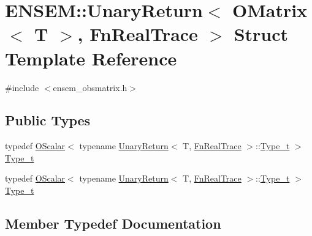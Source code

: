 \hypertarget{structENSEM_1_1UnaryReturn_3_01OMatrix_3_01T_01_4_00_01FnRealTrace_01_4}{}\section{E\+N\+S\+EM\+:\+:Unary\+Return$<$ O\+Matrix$<$ T $>$, Fn\+Real\+Trace $>$ Struct Template Reference}
\label{structENSEM_1_1UnaryReturn_3_01OMatrix_3_01T_01_4_00_01FnRealTrace_01_4}


{\ttfamily \#include $<$ensem\+\_\+obsmatrix.\+h$>$}

\subsection*{Public Types}
\begin{DoxyCompactItemize}
\item 
typedef \mbox{\hyperlink{classENSEM_1_1OScalar}{O\+Scalar}}$<$ typename \mbox{\hyperlink{structENSEM_1_1UnaryReturn}{Unary\+Return}}$<$ T, \mbox{\hyperlink{structENSEM_1_1FnRealTrace}{Fn\+Real\+Trace}} $>$\+::\mbox{\hyperlink{structENSEM_1_1UnaryReturn_3_01OMatrix_3_01T_01_4_00_01FnRealTrace_01_4_aaaa039ed6375a6c096ce155e79a2c9cd}{Type\+\_\+t}} $>$ \mbox{\hyperlink{structENSEM_1_1UnaryReturn_3_01OMatrix_3_01T_01_4_00_01FnRealTrace_01_4_aaaa039ed6375a6c096ce155e79a2c9cd}{Type\+\_\+t}}
\item 
typedef \mbox{\hyperlink{classENSEM_1_1OScalar}{O\+Scalar}}$<$ typename \mbox{\hyperlink{structENSEM_1_1UnaryReturn}{Unary\+Return}}$<$ T, \mbox{\hyperlink{structENSEM_1_1FnRealTrace}{Fn\+Real\+Trace}} $>$\+::\mbox{\hyperlink{structENSEM_1_1UnaryReturn_3_01OMatrix_3_01T_01_4_00_01FnRealTrace_01_4_aaaa039ed6375a6c096ce155e79a2c9cd}{Type\+\_\+t}} $>$ \mbox{\hyperlink{structENSEM_1_1UnaryReturn_3_01OMatrix_3_01T_01_4_00_01FnRealTrace_01_4_aaaa039ed6375a6c096ce155e79a2c9cd}{Type\+\_\+t}}
\end{DoxyCompactItemize}


\subsection{Member Typedef Documentation}
\mbox{\label{structENSEM_1_1UnaryReturn_3_01OMatrix_3_01T_01_4_00_01FnRealTrace_01_4_aaaa039ed6375a6c096ce155e79a2c9cd}} 
